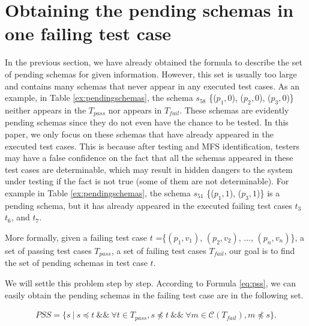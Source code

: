 \section{Obtaining the pending schemas in one failing test case}\label{sec:pending:obtaining}

In the previous section, we have already obtained the formula to describe the set of pending schemas for given information. However, this set is usually too large and contains many schemas that never appear in any executed test cases. As an example, in Table \ref{ex:pendingschemas}, the schema $s_{58}$ \{($p_{1}, 0$), ($p_{2}, 0$), ($p_{3}, 0$)\} neither appears in the $T_{pass}$ nor appears in $T_{fail}$. These schemas are evidently pending schemas since they do not even have the chance to be tested. In this paper, we only focus on these schemas that have already appeared in the executed test cases. This is because after testing and MFS identification, testers may have a false confidence on the fact that all the schemas appeared in these test cases are determinable, which may result in hidden dangers to the system under testing if the fact is not true (some of them are not determinable). For example in Table \ref{ex:pendingschemas}, the schema $s_{51}$  \{($p_{1}, 1$), ($p_{3}, 1$)\} is a pending schema, but it has already appeared in the executed failing test cases $t_{3}$ $t_{6}$, and $t_{7}$.

More formally,  given a failing test case $t$ =\{$(p_{1}, v_{1})$, $(p_{2}, v_{2})$, ..., $(p_{n}, v_{n})$\},  a set of passing test cases $T_{pass}$, a set of failing test cases $T_{fail}$, our goal is to find the set of pending schemas in test case $t$.


We will settle this problem step by step.  According to Formula \ref{eq:pss}, we can easily obtain the pending schemas in the failing test case are in the following set.

\begin{equation}
\begin{aligned}\label{eq:pssfirst}
PSS=\{ s\ |\ s \preceq t\ \&\&\ \forall t \in T_{pass},  s \npreceq t  \ \&\& \  \forall m \in \mathcal{C}(T_{fail}), m \npreceq s \}.
\end{aligned}
\end{equation}

